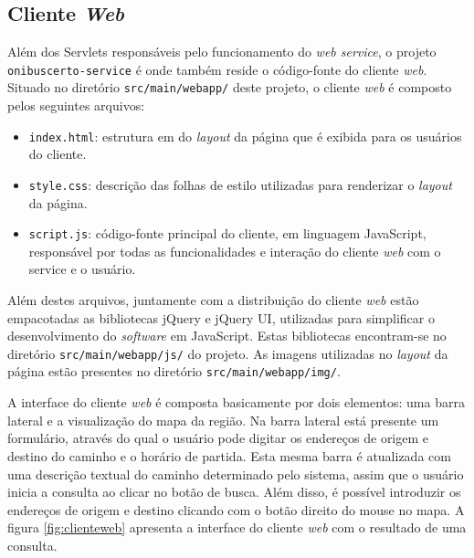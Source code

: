 \subsection{Cliente \emph{Web}}

Além dos Servlets responsáveis pelo funcionamento do \emph{web service}, o projeto \texttt{onibuscerto-service} é onde também reside o código-fonte do cliente \emph{web}.
Situado no diretório \texttt{src/main/webapp/} deste projeto, o cliente \emph{web} é composto pelos seguintes arquivos:

\begin{itemize}
	\item \texttt{index.html}: estrutura em  do \emph{layout} da página que é exibida para os usuários do cliente.
	\item \texttt{style.css}: descrição das folhas de estilo  utilizadas para renderizar o \emph{layout} da página.
	\item \texttt{script.js}: código-fonte principal do cliente, em linguagem JavaScript, responsável por todas as funcionalidades e interação do cliente \emph{web} com o service e o usuário.
\end{itemize}

Além destes arquivos, juntamente com a distribuição do cliente \emph{web} estão empacotadas as bibliotecas jQuery e jQuery UI, utilizadas para simplificar o desenvolvimento do \emph{software} em JavaScript.
Estas bibliotecas encontram-se no diretório \texttt{src/main/webapp/js/} do projeto.
As imagens utilizadas no \emph{layout} da página estão presentes no diretório \texttt{src/main/webapp/img/}.

A interface do cliente \emph{web} é composta basicamente por dois elementos: uma barra lateral e a visualização do mapa da região.
Na barra lateral está presente um formulário, através do qual o usuário pode digitar os endereços de origem e destino do caminho e o horário de partida.
Esta mesma barra é atualizada com uma descrição textual do caminho determinado pelo sistema, assim que o usuário inicia a consulta ao clicar no botão de busca.
Além disso, é possível introduzir os endereços de origem e destino clicando com o botão direito do mouse no mapa.
A figura \ref{fig:clienteweb} apresenta a interface do cliente \emph{web} com o resultado de uma consulta.

